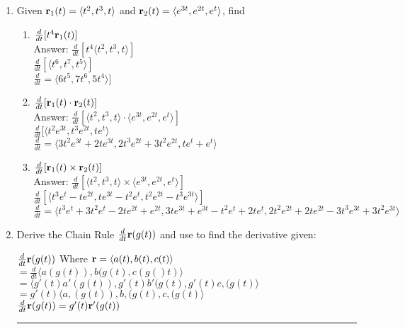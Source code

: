 \documentclass[11pt]{article}
\newenvironment{proof}{{\bf Proof:  }}{\hfill\rule{2mm}{2mm}}
\begin{document}
\begin{enumerate}
    \item Given ${\bf r}_1(t) = \langle t^2, t^3, t \rangle$ and ${\bf r}_2(t) = \langle e^{3t}, e^{2t}, e^t \rangle$, find 
    \begin{enumerate}
        \item $\frac{d}{dt} [t^4 {\bf r}_1(t)]$
        \\
        Answer: $\frac{d}{dt} [t^4 \langle t^2, t^3, t \rangle]$
        \\
        $\frac{d}{dt} [\langle t^6, t^7, t^5 \rangle]$
        \\
        $\frac{d}{dt}= \langle 6t^5, 7t^6, 5t^4 \rangle]$
        \item $\frac{d}{dt}  [{\bf r}_1(t) \cdot {\bf r}_2(t)]$
        \\
        Answer: $\frac{d}{dt} [\langle t^2, t^3, t \rangle \cdot \langle e^{3t}, e^{2t}, e^t \rangle] $
\\
$\frac{d}{dt} [\langle t^2e^{3t}, t^3e^{2t}, te^t \rangle $
\\
$\frac{d}{dt}=\langle 3t^2e^{3t}+2te^{3t}, 2t^3e^{2t}+3t^2e^{2t}, te^t+e^t \rangle$
        
        \item $\frac{d}{dt}  [{\bf r}_1(t) \times {\bf r}_2(t)]  $
        \\
        Answer: $\frac{d}{dt} [\langle t^2, t^3, t \rangle \times \langle e^{3t}, e^{2t}, e^t \rangle] $
        \\
        $\frac{d}{dt} [\langle t^3e^t-te^{2t}, te^{3t}-t^2e^t, t^2e^{2t}-t^3e^{3t}\rangle]$
        \\
        $\frac{d}{dt}=\langle t^3e^t+3t^2e^t-2te^{2t}+e^{2t}, 3te^{3t}+e^{3t}-t^2e^t+ 2te^t, 2t^2e^{2t}+2te^{2t}-3t^3e^{3t}+3t^2e^{3t}\rangle$
        
        
    \end{enumerate}
    
    
    
    \item Derive the Chain Rule $\frac{d}{dt} {\bf r}(g(t))$ and use to find the derivative given:
    
   
    \begin{proof}
  $\frac{d}{dt} {\bf r}(g(t))$ Where ${\bf r}=\langle a(t),b(t),c(t)\rangle$
  \\
  $=\frac{d}{dt} \langle a(g(t)),b(g(t),c(g()t)\rangle$
  \\
    $= \langle g'(t)a'(g(t)),g'(t)b'(g(t),g'(t)c,(g(t)\rangle$
    \\
      $= g'(t)\langle a,(g(t)),b,(g(t),c,(g(t)\rangle$
      \\
      $\frac{d}{dt} {\bf r}(g(t))= g'(t) {\bf r}'(g(t)) $
    \end{proof}
    

\end{enumerate}
\end{document}
